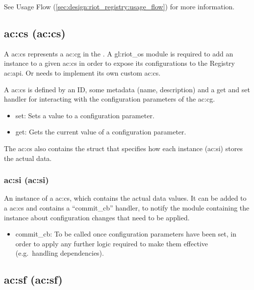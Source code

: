 See Usage Flow (\autoref{sec:design:riot_registry:usage_flow}) for more information.

\subsection{\acrlong*{ac:cs} (\acrshort*{ac:cs})}
\label{sec:design:riot_registry:configuration_schemas}

A \gls{ac:cs} represents a \gls{ac:cg} in the .
A \gls{gl:riot_os} module is required to add an instance to a given \gls{ac:cs} in order to expose its configurations to the Registry \gls{ac:api}.
Or needs to implement its own custom \gls{ac:cs}.

A \gls{ac:cs} is defined by an ID, some metadata (name, description) and a get and set handler for interacting with the configuration parameters of the \gls{ac:cg}.

\begin{itemize}
    \item set: Sets a value to a configuration parameter.
    \item get: Gets the current value of a configuration parameter.
\end{itemize}

The \gls{ac:cs} also contains the struct that specifies how each instance (\gls{ac:si}) stores the actual data.

\subsubsection{\acrlong*{ac:si} (\acrshort*{ac:si})}
\label{sec:design:riot_registry:schema_instances}

An instance of a \gls{ac:cs}, which contains the actual data values.
It can be added to a \gls{ac:cs} and contains a ``commit\_cb'' handler, to notify the module containing the instance about configuration changes that need to be applied.

\begin{itemize}
    \item commit\_cb:
          To be called once configuration parameters have been set, in order to apply any further logic required to make them effective (e.g.\ handling dependencies).
\end{itemize}

\subsection{\acrlong*{ac:sf} (\acrshort*{ac:sf})}
\label{sec:design:riot_registry:storage_facilities}

